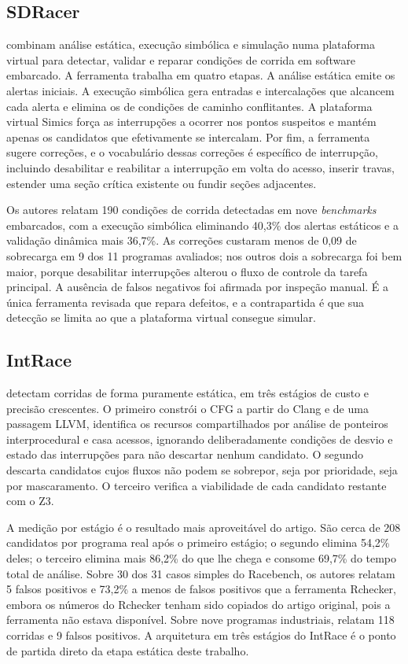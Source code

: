 \subsection{SDRacer}

 combinam análise estática, execução simbólica e simulação
numa plataforma virtual para detectar, validar e reparar condições de corrida
em software embarcado. A ferramenta trabalha em quatro etapas. A análise
estática emite os alertas iniciais. A execução simbólica gera entradas e
intercalações que alcancem cada alerta e elimina os de condições de caminho
conflitantes. A plataforma virtual Simics força as interrupções a ocorrer nos
pontos suspeitos e mantém apenas os candidatos que efetivamente se intercalam.
Por fim, a ferramenta sugere correções, e o vocabulário dessas correções é específico de
interrupção, incluindo desabilitar e reabilitar a interrupção em volta do
acesso, inserir travas, estender uma seção crítica existente ou fundir seções
adjacentes.

Os autores relatam 190 condições de corrida detectadas em nove
\textit{benchmarks} embarcados, com a execução simbólica eliminando 40,3\% dos
alertas estáticos e a validação dinâmica mais 36,7\%. As correções custaram
menos de 0,09 de sobrecarga em 9 dos 11 programas avaliados; nos outros dois a
sobrecarga foi bem maior, porque desabilitar interrupções alterou o fluxo de
controle da tarefa principal. A ausência de falsos negativos foi afirmada por
inspeção manual. É a única ferramenta revisada que repara defeitos, e a
contrapartida é que sua detecção se limita ao que a plataforma virtual consegue
simular.

\subsection{IntRace}

 detectam corridas de forma puramente estática, em três
estágios de custo e precisão crescentes. O primeiro constrói o CFG a partir do
Clang e de uma passagem LLVM, identifica os recursos compartilhados por análise
de ponteiros interprocedural e casa acessos, ignorando deliberadamente
condições de desvio e estado das interrupções para não descartar nenhum
candidato. O segundo
descarta candidatos cujos fluxos não podem se sobrepor, seja por prioridade,
seja por mascaramento. O terceiro verifica a viabilidade de cada candidato
restante com o Z3.

A medição por estágio é o resultado mais aproveitável do artigo. São cerca de
208 candidatos por programa real após o primeiro estágio; o segundo elimina
54,2\% deles; o terceiro elimina mais 86,2\% do que lhe chega e consome 69,7\%
do tempo total de análise. Sobre 30 dos 31 casos simples do Racebench, os
autores relatam 5 falsos positivos e 73,2\% a menos de falsos positivos que a
ferramenta Rchecker, embora os números do Rchecker tenham sido copiados do
artigo original, pois a ferramenta não estava disponível. Sobre nove programas
industriais, relatam 118 corridas e 9 falsos positivos. A arquitetura em três
estágios do IntRace é o ponto de partida direto da etapa estática deste
trabalho.

